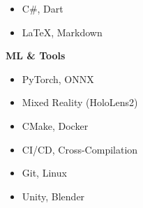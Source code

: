 {{\begin{itemize}[leftmargin=*]
        \item C\#, Dart
        \item LaTeX, Markdown
    \end{itemize}}
    {\textbf{ML \& Tools}
    \vspace{0.5em}
    \begin{itemize}[leftmargin=*]
        \item PyTorch, ONNX
        \item Mixed Reality (HoloLens2)
        \item CMake, Docker
        \item CI/CD, Cross-Compilation
        \item Git, Linux
        \item Unity, Blender
    \end{itemize}}
}
